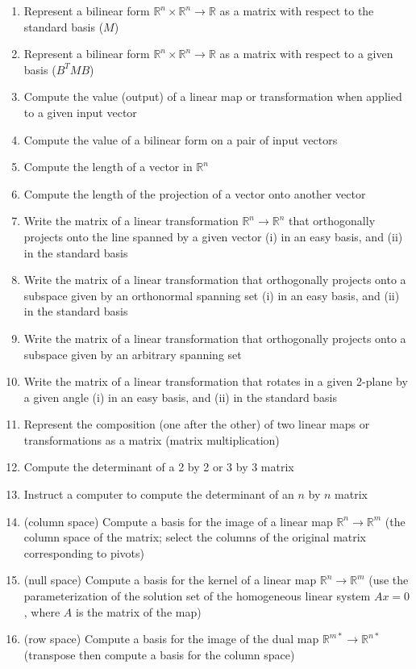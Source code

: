 \documentclass[10pt]{article}
\begin{document}
\begin{enumerate}
\item{Represent a bilinear form $\mathbb{R}^n\times\mathbb{R}^n\rightarrow\mathbb{R}$ as a matrix with respect to the standard basis ($M$)}
\item{Represent a bilinear form $\mathbb{R}^n\times\mathbb{R}^n\rightarrow\mathbb{R}$ as a matrix with respect to a given basis ($B^{T}MB$)}
\item{Compute the value (output) of a linear map or transformation when applied to a given input vector}
\item{Compute the value of a bilinear form on a pair of input vectors}
\item{Compute the length of a vector in $\mathbb{R}^n$}
\item{Compute the length of the projection of a vector onto another vector}
\item{Write the matrix of a linear transformation $\mathbb{R}^n\rightarrow\mathbb{R}^n$ that orthogonally projects onto the line spanned by a given vector (i) in an easy basis, and (ii) in the standard basis}
\item{Write the matrix of a linear transformation that orthogonally projects onto a subspace given by an orthonormal spanning set (i) in an easy basis, and (ii) in the standard basis}
\item{Write the matrix of a linear transformation that orthogonally projects onto a subspace given by an arbitrary spanning set}
\item{Write the matrix of a linear transformation that rotates in a given 2-plane by a given angle (i) in an easy basis, and (ii) in the standard basis}
\item{Represent the composition (one after the other) of two linear maps or transformations as a matrix (matrix multiplication)}
\item{Compute the determinant of a 2 by 2 or 3 by 3 matrix}
\item{Instruct a computer to compute the determinant of an $n$ by $n$ matrix}
\item{(column space) Compute a basis for the image of a linear map $\mathbb{R}^n\rightarrow\mathbb{R}^m$ (the column space of the matrix; select the columns of the original matrix corresponding to pivots)}
\item{(null space) Compute a basis for the kernel of a linear map $\mathbb{R}^n\rightarrow\mathbb{R}^m$ (use the parameterization of the solution set of the homogeneous linear system $Ax=0$, where $A$ is the matrix of the map)}
\item{(row space) Compute a basis for the image of the dual map $\mathbb{R}^{m*}\rightarrow\mathbb{R}^{n*}$ (transpose then compute a basis for the column space)}

\end{enumerate}
\end{document}
